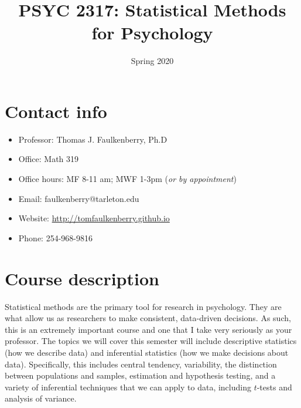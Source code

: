 \documentclass[10pt]{article}
\date{Spring 2020}
\title{PSYC 2317: Statistical Methods for Psychology}
\begin{document}
\maketitle

\section*{Contact info}
\label{sec:org4a538aa}
\begin{itemize}
\item Professor: Thomas J. Faulkenberry, Ph.D
\item Office: Math 319
\item Office hours: MF 8-11 am; MWF 1-3pm (\emph{or by appointment})
\item Email: faulkenberry@tarleton.edu
\item Website: \url{http://tomfaulkenberry.github.io}
\item Phone: 254-968-9816
\end{itemize}

\section*{Course description}
\label{sec:orgab4571d}

Statistical methods are the primary tool for research in psychology. They are what allow us as researchers to make consistent, data-driven decisions.  As such, this is an extremely important course and one that I take very seriously as your professor. The topics we will cover this semester will include descriptive statistics (how we describe data) and inferential statistics (how we make decisions about data).  Specifically, this includes central tendency, variability, the distinction between populations and samples, estimation and hypothesis testing, and a variety of inferential techniques that we can apply to data, including \(t\)-tests and analysis of variance.
\end{document}
